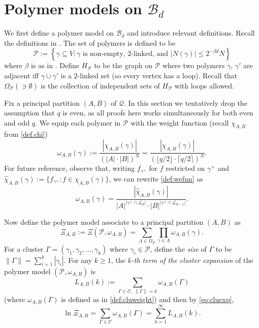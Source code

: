 \documentclass{amsart}
\theoremstyle{definition}
\newcommand{\we}{\omega}
\newcommand{\cB}{\mathcal{B} }
\newcommand{\cP}{\mathcal{P} }
\newcommand{\cQ}{\mathcal{Q} }
\newcommand{\beq}[1]{\begin{equation}\label{#1}}
\newcommand{\enq}[0]{\end{equation}}
\newcommand{\0}[0]{\emptyset}
\begin{document}
\section{Polymer models on $\cB_d$}\label{sec.polymer models}


We first define a polymer model on $\cB_d$ and introduce relevant definitions. Recall the definitions in . The set of polymers is defined to be
\begin{equation}\label{def:polymer}
\cP:=\left\{\gamma\subseteq V: \gamma \text{ is non-empty, 2-linked, and } |N(\gamma)|\leq 2^{-\beta d}N\right\}
\end{equation}
where $\beta$ is as in . Define $H_{\cP}$ to be the graph on $\cP$ where two polymers $\gamma$, $\gamma'$ are  adjacent iff $\gamma\cup \gamma'$ is a $2$-linked set (so every vertex has a loop). Recall that $\Omega_{\cP} (\ni \emptyset)$ is the collection of independent sets of $H_{\cP}$ with loops allowed.


Fix a principal partition $(A, B)$ of $\cQ$. 
In this section we tentatively drop the assumption that $q$ is even, as all proofs here works simultaneously for both even and odd $q$.
We equip each polymer in $\cP$ with the weight function (recall $\chi_{A,B}$ from \eqref{def.chi})
\begin{equation}\label{def:wefun}
\we_{A,B}(\gamma):=\frac{|\chi_{A, B}(\gamma)|}{(|A|\cdot|B|)^{N}} = \frac{|\chi_{A, B}(\gamma)|}{(\lfloor q/2 \rfloor\cdot\lceil q/2 \rceil)^{N}}.
\end{equation}
For future reference, observe that, writing $f_{\gamma^+}$ for $f$ restricted on $\gamma^+$ and $\hat{\chi}_{A, B}(\gamma):=\{ f_{\gamma^+} : f\in \chi_{A, B}(\gamma)\}$,
we can rewrite \eqref{def:wefun} as
\beq{eq.wefun.reform}
\omega_{A,B}(\gamma)=\frac{|\hat{\chi}_{A, B}(\gamma)|}{|A|^{|\gamma^+\cap \mathcal{L}_d|}\cdot|B|^{|\gamma^+\cap\mathcal{L}_{d-1}|}}.
\enq





Now define the polymer model associate to a principal partition $(A, B)$ as
\[
\Xi_{A,B}:=\Xi(\cP, \we_{A, B})=\sum_{\Lambda\in\Omega_{\cP}}\prod_{\gamma\in\Lambda}\we_{A, B}(\gamma).
\]
For a cluster $\Gamma=(\gamma_1, \gamma_2, \ldots, \gamma_k)$ where $\gamma_i\in \cP$, define the \textit{size} of $\Gamma$ to be $\lVert \Gamma\rVert=\sum_{i=1}^k|\gamma_i|$.
For any $k\geq 1$, the \textit{$k$-th term of the cluster expansion} of the polymer model $(\cP, \we_{A, B})$ is
\begin{equation}\label{def:LAB}
L_{A, B}(k):=\sum_{\Gamma\in \mathcal{C},\  \lVert \Gamma\rVert=k}\we_{A,B}(\Gamma)
\end{equation}
(where $\we_{A,B}(\Gamma)$ is defined as in \eqref{def:cluweight})
and then by \eqref{eq:cluexp},
\begin{equation}\label{def:Lsum}
 \ln\Xi_{A,B} = \sum_{\Gamma\in\mathcal{C}}\we_{A,B}(\Gamma) = \sum_{k=1}^{\infty}L_{A, B}(k). 
\end{equation}
\end{document}

